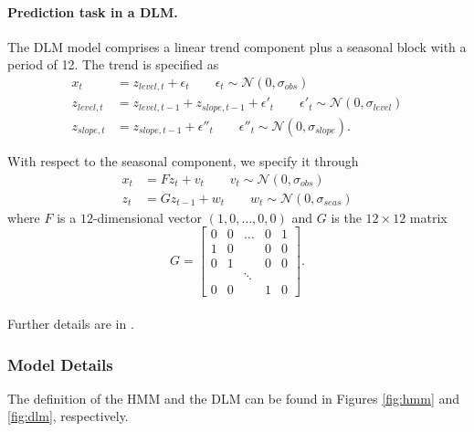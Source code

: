 \paragraph{Prediction task in a DLM.}
The DLM model comprises a linear trend component plus a seasonal block with a period of 12. The trend is specified as
\begin{align*}
x_t &= z_{level,t} + \epsilon_t \qquad \epsilon_t \sim \mathcal{N}(0, \sigma_{obs}) \\
z_{level,t} &= z_{level,t-1} + z_{slope,t-1} + \epsilon'_t \qquad \epsilon'_t \sim \mathcal{N}(0, \sigma_{level}) \\
z_{slope,t} &= z_{slope,t-1} + \epsilon''_t \qquad \epsilon''_t \sim \mathcal{N}(0, \sigma_{slope}).
\end{align*}

With respect to the seasonal component,
we specify it through
\begin{align*}
x_t &= F z_t + v_t \qquad v_t \sim \mathcal{N}(0, \sigma_{obs})\\
z_t &= G z_{t-1} + w_t \qquad w_t \sim \mathcal{N}(0, \sigma_{seas})
\end{align*}
where $F$ is a $12$-dimensional vector
$( 1,0,\ldots, 0,0)$ 
and $G$ is the $12\times 12$ matrix 
\begin{equation*}
G = \begin{bmatrix}
0 & 0 & \ldots & 0 & 1 \\
1 &	0 & & 0 & 0 \\
0 & 1 & & 0 & 0 \\
 & & \ddots & & \\
 0 & 0 & & 1 & 0
\end{bmatrix}.
\end{equation*}
\\

Further details are in \textcite{west1998bayesian}.
\iffalse
\subsubsection{Model Details} The definition of the HMM and the DLM can be found in Figures \ref{fig:hmm} and \ref{fig:dlm}, respectively.

